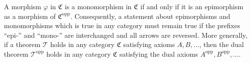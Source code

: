 A morphism $\varphi$ in $\mathfrak{C}$ is a monomorphism in $\mathfrak{C}$ if and only if it is an epimorphism as a morphism of $\mathfrak{C}^{\text{opp}}$. Consequently, a statement about epimorphisms and monomorphisms which is true in any category must remain true if the prefixes ``epi-'' and ``mono-'' are interchanged and all arrows are reversed. More generally, if a theorem $\mathcal{T}$ holds in any category $\mathfrak{C}$ satisfying axioms $A, B, \ldots$, then the dual theorem $\mathcal{T}^{\text{opp}}$ holds in any category $\mathfrak{C}$ satisfying the dual axioms $A^{\text{opp}}, B^{\text{opp}}, \ldots$.
